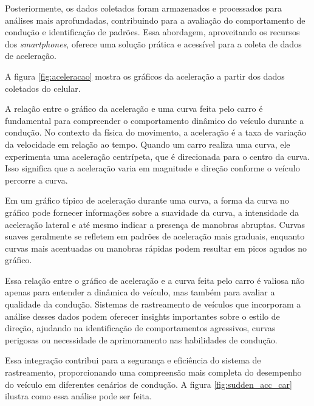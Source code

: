 Posteriormente, os dados coletados foram armazenados e processados para análises mais aprofundadas, contribuindo para a avaliação do comportamento de condução e identificação de padrões. Essa abordagem, aproveitando os recursos dos \textit{smartphones}, oferece uma solução prática e acessível para a coleta de dados de aceleração.

A figura \ref{fig:aceleracao} mostra os gráficos da aceleração a partir dos dados coletados do celular. 

A relação entre o gráfico da aceleração e uma curva feita pelo carro é fundamental para compreender o comportamento dinâmico do veículo durante a condução. No contexto da física do movimento, a aceleração é a taxa de variação da velocidade em relação ao tempo. Quando um carro realiza uma curva, ele experimenta uma aceleração centrípeta, que é direcionada para o centro da curva. Isso significa que a aceleração varia em magnitude e direção conforme o veículo percorre a curva.

Em um gráfico típico de aceleração durante uma curva, a forma da curva no gráfico pode fornecer informações sobre a suavidade da curva, a intensidade da aceleração lateral e até mesmo indicar a presença de manobras abruptas. Curvas suaves geralmente se refletem em padrões de aceleração mais graduais, enquanto curvas mais acentuadas ou manobras rápidas podem resultar em picos agudos no gráfico.

Essa relação entre o gráfico de aceleração e a curva feita pelo carro é valiosa não apenas para entender a dinâmica do veículo, mas também para avaliar a qualidade da condução. Sistemas de rastreamento de veículos que incorporam a análise desses dados podem oferecer insights importantes sobre o estilo de direção, ajudando na identificação de comportamentos agressivos, curvas perigosas ou necessidade de aprimoramento nas habilidades de condução. 

Essa integração contribui para a segurança e eficiência do sistema de rastreamento, proporcionando uma compreensão mais completa do desempenho do veículo em diferentes cenários de condução. A figura \ref{fig:sudden_acc_car} ilustra como essa análise pode ser feita.

